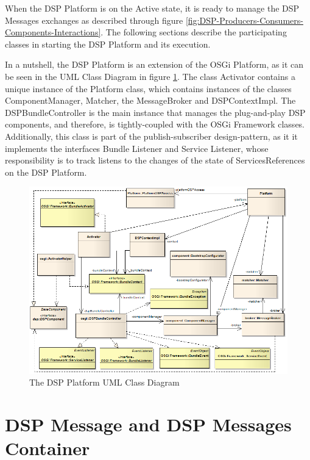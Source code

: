 When the DSP Platform is on the Active state, it is ready to manage the DSP
Messages exchanges as described through figure
\ref{fig:DSP-Producers-Consumers-Components-Interactions}. The following
sections describe the participating classes in starting the DSP Platform and
its execution.

In a nutshell, the DSP Platform is an extension of the OSGi Platform, as it can
be seen in the UML Class Diagram \cite{uml} in figure
\ref{fig:DSP-Platform-Class-Diagram-Simple}. The class Activator contains a
unique instance of the Platform class, which contains instances of the classes
ComponentManager, Matcher, the MessageBroker and DSPContextImpl. The
DSPBundleController is the main instance that manages the plug-and-play DSP
components, and therefore, is tightly-coupled with the OSGi Framework classes.
Additionally, this class is part of the publish-subscriber design-pattern, as
it it implements the interfaces Bundle Listener and Service Listener, whose
responsibility is to track listens to the changes of the state of
ServicesReferences on the DSP Platform.

\begin{figure}[!t]
  \centering
  \includegraphics[scale=0.7]{../diagrams/DSP-Platform-Class-Diagram-Simple}
  \caption{The DSP Platform UML Class Diagram}
  \label{fig:DSP-Platform-Class-Diagram-Simple}
\end{figure}

\section{DSP Message and DSP Messages Container}
\label{sec:dsp-message}

